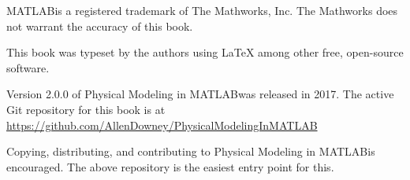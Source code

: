 \documentclass[
]{book}
\numberwithin{Answer}{chapter}
\numberwithin{Exercise}{chapter}
\newcommand{\myreg}{\textsuperscript{{\tiny \textregistered}}}
\newcommand{\thetitle}{Physical Modeling in MATLAB\myreg}
\begin{document}
MATLAB\myreg is a registered trademark of The
Mathworks, Inc.  The Mathworks does not warrant the accuracy
of this book.

\vspace{2em}

This book was typeset by the authors using \LaTeX
among other free, open-source software.

Version 2.0.0 of \thetitle was released in 2017. The active Git
    repository for this book is at
    \url{https://github.com/AllenDowney/PhysicalModelingInMATLAB}

Copying, distributing, and contributing to \thetitle is encouraged.
The above repository is the easiest entry point for this.





\tableofcontents


\mainmatter






























\begin{appendices}



\end{appendices}

\printindex
\end{document}
